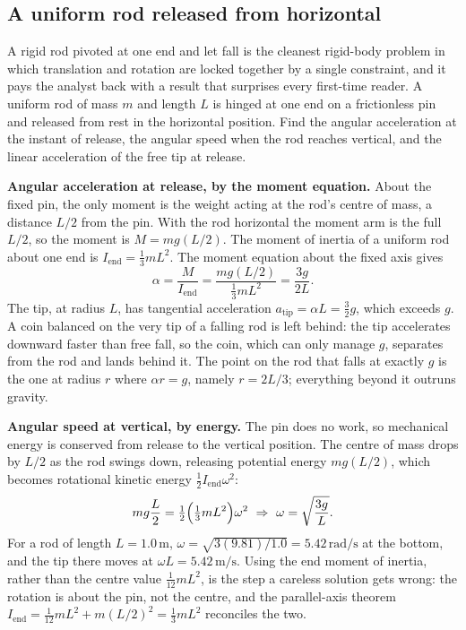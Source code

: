 \subsection{A uniform rod released from horizontal}

A rigid rod pivoted at one end and let fall is the cleanest rigid-body
problem in which translation and rotation are locked together by a
single constraint, and it pays the analyst back with a result that
surprises every first-time reader. A uniform rod of mass $m$ and length
$L$ is hinged at one end on a frictionless pin and released from rest in
the horizontal position. Find the angular acceleration at the instant of
release, the angular speed when the rod reaches vertical, and the linear
acceleration of the free tip at release.

\textbf{Angular acceleration at release, by the moment equation.} About
the fixed pin, the only moment is the weight acting at the rod's centre
of mass, a distance $L/2$ from the pin. With the rod horizontal the
moment arm is the full $L/2$, so the moment is $M=mg(L/2)$. The moment of
inertia of a uniform rod about one end is $I_{\text{end}}=\tfrac{1}{3}m
L^{2}$. The moment equation about the fixed axis gives
\[
\alpha=\frac{M}{I_{\text{end}}}=\frac{mg(L/2)}{\tfrac{1}{3}mL^{2}}
=\frac{3g}{2L}.
\]
The tip, at radius $L$, has tangential acceleration $a_{\text{tip}}=
\alpha L=\tfrac{3}{2}g$, which exceeds $g$. A coin balanced on the very
tip of a falling rod is left behind: the tip accelerates downward faster
than free fall, so the coin, which can only manage $g$, separates from
the rod and lands behind it. The point on the rod that falls at exactly
$g$ is the one at radius $r$ where $\alpha r=g$, namely $r=2L/3$;
everything beyond it outruns gravity.

\textbf{Angular speed at vertical, by energy.} The pin does no work, so
mechanical energy is conserved from release to the vertical position. The
centre of mass drops by $L/2$ as the rod swings down, releasing
potential energy $mg(L/2)$, which becomes rotational kinetic energy
$\tfrac{1}{2}I_{\text{end}}\omega^{2}$:
\[
mg\frac{L}{2}=\tfrac{1}{2}\Bigl(\tfrac{1}{3}mL^{2}\Bigr)\omega^{2}
\ \Rightarrow\
\omega=\sqrt{\frac{3g}{L}}.
\]
For a rod of length $L=1.0\,\si{\meter}$, $\omega=\sqrt{3(9.81)/1.0}=
5.42\,\si{\radian\per\second}$ at the bottom, and the tip there moves at
$\omega L=5.42\,\si{\meter\per\second}$. Using the end moment of inertia,
rather than the centre value $\tfrac{1}{12}mL^{2}$, is the step a careless
solution gets wrong: the rotation is about the pin, not the centre, and
the parallel-axis theorem $I_{\text{end}}=\tfrac{1}{12}mL^{2}+m(L/2)^{2}=
\tfrac{1}{3}mL^{2}$ reconciles the two.

